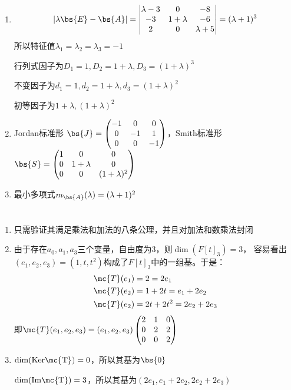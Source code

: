 \documentclass[12pt, a4paper, oneside]{ctexbook}
\begin{document}
\section{}
\begin{enumerate}
\item \begin{align*}
|\lambda \bs{E}-\bs{A}|=\begin{vmatrix}
    \lambda-3 &0 &-8 \\
    -3 & 1+\lambda & -6 \\
    2 &0 &\lambda +5
\end{vmatrix}=(\lambda+1)^3
\end{align*}
所以特征值$\lambda_1=\lambda_2=\lambda_3=-1$

行列式因子为$D_1=1,D_2=1+\lambda,D_3=(1+\lambda)^3$

不变因子为$d_1=1,d_2=1+\lambda,d_3=(1+\lambda)^2$

初等因子为$1+\lambda,(1+\lambda)^2$

\item Jordan标准形
$\bs{J}=\begin{pmatrix}
    -1 & 0 & 0\\
    0& -1 & 1 \\
    0& 0 & -1
\end{pmatrix}$，Smith标准形$\bs{S}=\begin{pmatrix}
    1 & 0 & 0\\
    0& 1+\lambda & 0 \\
    0& 0 & (1+\lambda)^2
\end{pmatrix}$

\item 最小多项式$m_{\bs{A}}(\lambda)=(\lambda+1)^2$
\end{enumerate}

\section{}
\begin{enumerate}
\item 只需验证其满足乘法和加法的八条公理，并且对加法和数乘法封闭
\item 由于存在$a_0,a_1,a_3$三个变量，自由度为3，则$\dim{(F[t]_3)}=3$，
容易看出$(e_1,e_2,e_3)=(1,t,t^2)$构成了$F[t]_3$中的一组基。于是：
\begin{align*}
\mc{T}(e_1)&=2=2e_1 \\
\mc{T}(e_2)&=1+2t=e_1+2e_2 \\
\mc{T}(e_2)&=2t+2t^2=2e_2+2e_3
\end{align*}
即$\mc{T}(e_1,e_2,e_3)=(e_1,e_2,e_3)
\begin{pmatrix}
2 & 1 & 0 \\
0 & 2 & 2 \\
0 & 0 & 2      
\end{pmatrix}$

\item $\dim(\rm{Ker}\mc{T})=0$，所以其基为$\bs{0}$

$\dim(\rm{Im}\mc{T})=3$，所以其基为$(2e_1,e_1+2e_2,2e_2+2e_3)$

\end{enumerate}
\end{document}

